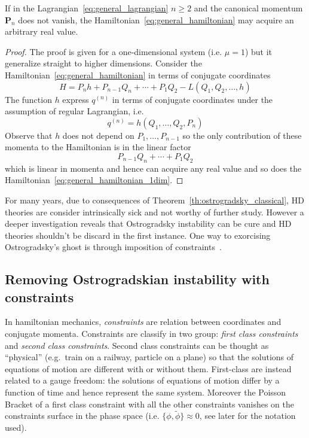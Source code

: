 \begin{theorem}[Ostrogradsky]\label{th:ostrogradsky_classical}
  If in the Lagrangian~\eqref{eq:general_lagrangian} $n \geq 2$ and the
  canonical momentum $\bm{P}_n$ does not vanish, the
  Hamiltonian~\eqref{eq:general_hamiltonian} may acquire an arbitrary real
  value.
\end{theorem}
\begin{proof}
  The proof is given for a one-dimensional system (i.e. $\mu=1$) but it
  generalize straight to higher dimensions. Consider the
  Hamiltonian~\eqref{eq:general_hamiltonian} in terms of conjugate coordinates
  \begin{equation} \label{eq:general_hamiltonian_1dim}
    H = P_n h + P_{n-1} Q_n + \cdots + P_1 Q_2 - L(Q_1, Q_2, \ldots, h)
  \end{equation}
  The function $h$ express $q^{(n)}$ in terms of conjugate coordinates under
  the assumption of regular Lagrangian, i.e.
  \begin{equation*}
    q^{(n)} = h(Q_1, \ldots, Q_2, P_n)
  \end{equation*}
  Observe that $h$ does not depend on $P_1, \ldots, P_{n-1}$ so the only
  contribution of these momenta to the Hamiltonian is in the linear factor
  \begin{equation*}
    P_{n-1} Q_n + \cdots + P_1 Q_2
  \end{equation*}
  which is linear in momenta and hence can acquire any real value and so does
  the Hamiltonian~\eqref{eq:general_hamiltonian_1dim}.
\end{proof}

For many years, due to consequences of Theorem~\ref{th:ostrogradsky_classical},
HD theories are consider intrinsically sick and not worthy of further study.
However a deeper investigation reveals that Ostrogradsky instability can be cure
and HD theories shouldn't be discard in the first instance. One way to
exorcising Ostrogradsky's ghost is through imposition of
constraints~\cite{Chen13}.


\subsection{Removing Ostrogradskian instability with constraints}

In hamiltonian mechanics, \emph{constraints} are relation between coordinates
and conjugate momenta. Constraints are classify in two group: \emph{first class
constraints} and \emph{second class constraints}. Second class constraints can
be thought as ``physical'' (e.g.\ train on a railway, particle on a plane) so
that the solutions of equations of motion are different with or without them.
First-class are instead related to a gauge freedom: the solutions of equations
of motion differ by a function of time and hence represent the same system.
Moreover the Poisson Bracket of a first class constraint with all the other
constraints vanishes on the constraints surface in the phase space (i.e.
$\{\phi, \tilde{\phi}\} \approx 0$, see later for the notation used).


